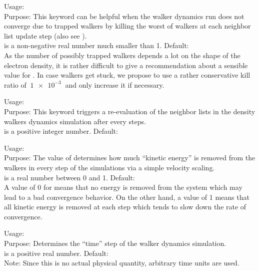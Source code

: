 {
  \noindent
  Usage:   \\[1.0ex] 
  Purpose: This keyword can be helpful when the walker 
    dynamics run does not converge due to trapped walkers 
    by killing the worst  of walkers 
    at each neighbor list update step (also see 
    ). \\[1.0ex]
   is a non-negative real number
    much smaller than 1. Default:  \\
}
As the number of possibly trapped walkers depends a lot 
on the shape of the electron density, it is rather 
difficult to give a recommendation about a sensible 
value for . In case walkers 
get stuck, we propose to use a rather conservative 
kill ratio of $~\SI{1e-3}{}$ and only increase it 
if necessary. 

{
  \noindent
  Usage:   \\[1.0ex] 
  Purpose: This keyword triggers a re-evaluation of the 
    neighbor lists in the density walkers dynamics simulation 
    after every  steps. \\[1.0ex]
   is a positive integer number. Default:  \\
}

{
  \noindent
  Usage:   \\[1.0ex] 
  Purpose: The value of  determines how much 
    ``kinetic energy'' is removed from the walkers in 
    every step of the simulations via a simple  
    velocity scaling. \\[1.0ex]
   is a real number between 0 and 1. 
    Default:  \\
}
A value of 0 for  means that no energy is 
removed from the system which may lead to a bad convergence 
behavior. On the other hand, a value of 1 means that all 
kinetic energy is removed at each step which tends to 
slow down the rate of convergence. 

{
  \noindent
  Usage:   \\[1.0ex] 
  Purpose: Determines the ``time'' step of the 
    walker dynamics simulation. \\[1.0ex]
   is a positive real number. Default:  \\
}
Note: Since this is no actual physical quantity, arbitrary 
time units are used. 

